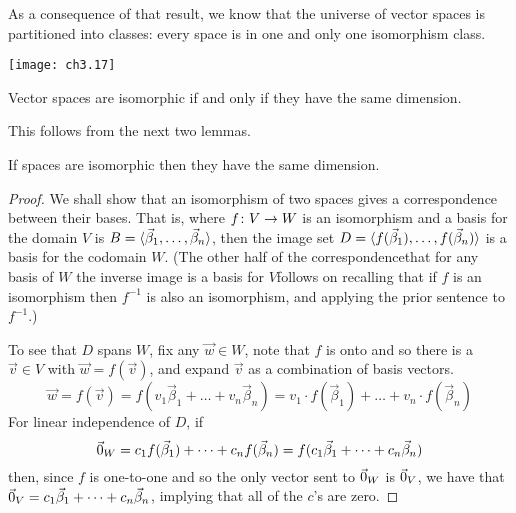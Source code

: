 As a consequence of that result, we know that the universe of vector spaces is
partitioned into classes:
every space is in one and only one isomorphism class.
\begin{center} \small
  \texttt{[image: ch3.17]}
\end{center}

\begin{theorem} \label{th:NDimSpaceIsoRN}
Vector spaces are isomorphic if and only if they have the same dimension.
\end{theorem}

This follows from the next two lemmas.

\begin{lemma}   \label{lem:IsoImpliesSameDim}
If spaces are isomorphic then they have the same dimension.
\end{lemma}

\begin{proof}
We shall show that an isomorphism of two spaces gives a correspondence 
between their bases.
That is, where \( \mbox{$f\colon V\to W$} \) is an isomorphism and
a basis for the domain $V$ is 
\( B=\langle\vec{\beta}_1,\dots,\vec{\beta}_n\rangle \),
then the image set
\( D=\langle f(\vec{\beta}_1),\dots,f(\vec{\beta}_n)\rangle \)
is a basis for the codomain \( W \).
(The other half of the correspondence\Dash that  
for any basis of $W$ the inverse image is a 
basis for $V$\Dash follows on recalling that if $f$ is an isomorphism 
then $f^{-1}$ is also an isomorphism, 
and applying the prior sentence to $f^{-1}$.)

To see that \( D \) spans \( W \), fix any \( \vec{w}\in W \),
note that \( f \) is onto and so there is a \( \vec{v}\in V \) with
\( \vec{w}=f(\vec{v}) \), and expand \( \vec{v} \) as a combination of
basis vectors.
\begin{equation*}
  \vec{w}=f(\vec{v})
  =f(v_1\vec{\beta}_1+\dots+v_n\vec{\beta}_n)  
  =v_1\cdot f(\vec{\beta}_1)+\dots+v_n\cdot f(\vec{\beta}_n)
\end{equation*}
For linear independence of $D$, if
\begin{equation*}
  \vec{0}_W
  =c_1f(\vec{\beta}_1)+\dots+c_nf(\vec{\beta}_n)  
  =f(c_1\vec{\beta}_1+\dots+c_n\vec{\beta}_n)
\end{equation*}
then, since \( f \) is one-to-one and so the only vector sent to 
\( \vec{0}_W \) is \( \vec{0}_V \), we have that
\( \vec{0}_V=c_1\vec{\beta}_1+\dots+c_n\vec{\beta}_n \),
implying that all of the \( c \)'s are zero.
\end{proof}

